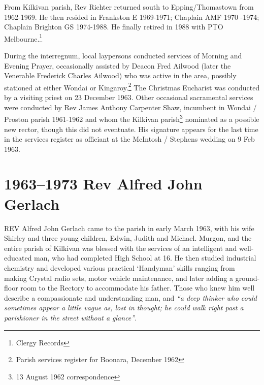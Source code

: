 From Kilkivan parish, Rev Richter returned south to Epping/Thomastown from 1962-1969. He then resided in Frankston E 1969-1971; Chaplain AMF 1970 -1974; Chaplain Brighton GS 1974-1988. He finally retired in 1988 with PTO Melbourne.\footnote{Clergy Records}


During the interregnum, local laypersons conducted services of Morning and Evening Prayer, occasionally assisted by Deacon Fred Ailwood (later the Venerable Frederick Charles Ailwood) who was active in the area, possibly stationed at either Wondai or Kingaroy.\footnote{Parish services register for Boonara, December 1962} The Christmas Eucharist was conducted by a visiting priest on 23 December 1963. Other occasional sacramental services were conducted by Rev James Anthony Carpenter Shaw, incumbent in Wondai / Proston parish 1961-1962 and whom the Kilkivan parish\footnote{13 August 1962 correspondence} nominated as a possible new rector, though this did not eventuate. His signature appears for the last time in the services register as officiant at the McIntosh / Stephens wedding on 9 Feb 1963.


\balance


\printendnotes[custom]
\setcounter{endnote}{0}
\chapter{1963--1973 Rev Alfred John Gerlach}
\nobalance


\lettrine[lines=3]{R}{EV}
 Alfred John Gerlach came to the parish in early March 1963, with his wife Shirley and three young children, Edwin, Judith and Michael. Murgon, and the entire parish of Kilkivan was blessed with the services of an intelligent and well-educated man, who had completed High School at 16. He then studied industrial chemistry and developed various practical `Handyman' skills ranging from making Crystal radio sets, motor vehicle maintenance, and later adding a ground-floor room to the Rectory to accommodate his father. Those who knew him well describe a compassionate and understanding man, and \emph{``a deep thinker who could sometimes appear a little vague as, lost in thought; he could walk right past a parishioner in the street without a glance''}.







